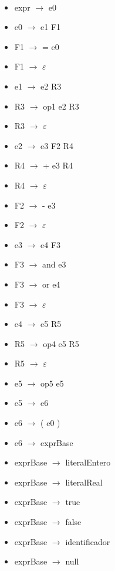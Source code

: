 \documentclass[11pt]{article}
\begin{document}
            \ 
            \begin{itemize}
                \item expr $\rightarrow$ e0
                \item e0 $\rightarrow$ e1 F1
                \item F1 $\rightarrow$ = e0
                \item F1 $\rightarrow$ $\varepsilon$
                \item e1 $\rightarrow$ e2 R3
                \item R3 $\rightarrow$ op1 e2 R3
                \item R3 $\rightarrow$ $\varepsilon$
                \item e2 $\rightarrow$ e3 F2 R4
                \item R4 $\rightarrow$ + e3 R4
                \item R4 $\rightarrow$ $\varepsilon$
                \item F2 $\rightarrow$ - e3
                \item F2 $\rightarrow$ $\varepsilon$
                \item e3 $\rightarrow$ e4 F3
                \item F3 $\rightarrow$ and e3
                \item F3 $\rightarrow$ or e4
                \item F3 $\rightarrow$ $\varepsilon$
                \item e4 $\rightarrow$ e5 R5
                \item R5 $\rightarrow$ op4 e5 R5
                \item R5 $\rightarrow$ $\varepsilon$
                \item e5 $\rightarrow$ op5 e5
                \item e5 $\rightarrow$ e6
                \item e6 $\rightarrow$ ( e0 )
                \item e6 $\rightarrow$ exprBase
                \item exprBase $\rightarrow$ literalEntero
                \item exprBase $\rightarrow$ literalReal
                \item exprBase $\rightarrow$ true
                \item exprBase $\rightarrow$ false
                \item exprBase $\rightarrow$ identificador
                \item exprBase $\rightarrow$ null

\end{itemize}
\end{document}
